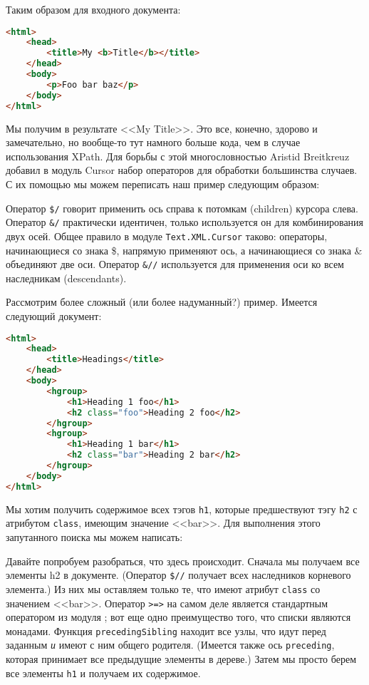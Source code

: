 Таким образом для входного документа:

\begin{lstlisting}[language=HTML]
<html>
    <head>
        <title>My <b>Title</b></title>
    </head>
    <body>
        <p>Foo bar baz</p>
    </body>
</html>
\end{lstlisting}

Мы получим в результате <<My Title>>. Это все, конечно, здорово и замечательно, но вообще-то тут намного больше кода, чем в случае использования XPath. Для борьбы с этой многословностью Aristid Breitkreuz добавил в модуль Cursor набор операторов для обработки большинства случаев. С их помощью мы можем переписать наш пример следующим образом:



Оператор \lstinline!$/! говорит применить ось справа к потомкам (children) курсора слева. Оператор \lstinline!&/! практически идентичен, только используется он для комбинирования двух осей. Общее правило в модуле \lstinline!Text.XML.Cursor! таково: операторы, начинающиеся со знака \$, напрямую применяют ось, а начинающиеся со знака \& объединяют две оси. Оператор \lstinline!&//! используется для применения оси ко всем наследникам (descendants).

Рассмотрим более сложный (или более надуманный?) пример. Имеется следующий документ:

\begin{lstlisting}[language=HTML]
<html>
    <head>
        <title>Headings</title>
    </head>
    <body>
        <hgroup>
            <h1>Heading 1 foo</h1>
            <h2 class="foo">Heading 2 foo</h2>
        </hgroup>
        <hgroup>
            <h1>Heading 1 bar</h1>
            <h2 class="bar">Heading 2 bar</h2>
        </hgroup>
    </body>
</html>
\end{lstlisting}

Мы хотим получить содержимое всех тэгов \lstinline!h1!, которые предшествуют тэгу \lstinline!h2! с атрибутом \lstinline!class!, имеющим значение <<bar>>. Для выполнения этого запутанного поиска мы можем написать:



Давайте попробуем разобраться, что здесь происходит. Сначала мы получаем все элементы h2 в документе. (Оператор \lstinline!$//! получает всех наследников корневого элемента.) Из них мы оставляем только те, что имеют атрибут \lstinline!class! со значением <<bar>>. Оператор \lstinline!>=>! на самом деле является стандартным оператором из модуля ; вот еще одно преимущество того, что списки являются монадами. Функция \lstinline!precedingSibling! находит все узлы, что идут перед заданным \emph{и} имеют с ним общего родителя. (Имеется также ось \lstinline!preceding!, которая принимает все предыдущие элементы в дереве.) Затем мы просто берем все элементы \lstinline!h1! и получаем их содержимое.

